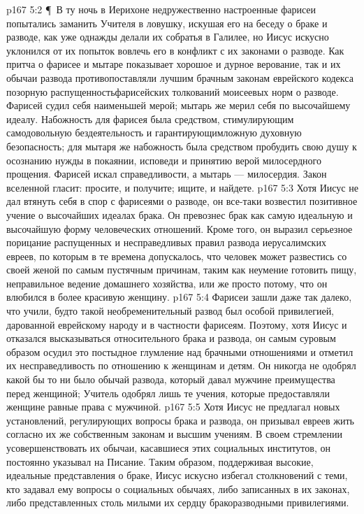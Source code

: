\vs p167 5:2 \P\ В ту ночь в Иерихоне недружественно настроенные фарисеи попытались заманить Учителя в ловушку, искушая его на беседу о браке и разводе, как уже однажды делали их собратья в Галилее, но Иисус искусно уклонился от их попыток вовлечь его в конфликт с их законами о разводе. Как притча о фарисее и мытаре показывает хорошое и дурное верование, так и их обычаи развода противопоставляли лучшим брачным законам еврейского кодекса позорную распущенностьфарисейских толкований моисеевых норм о разводе. Фарисей судил себя наименьшей мерой; мытарь же мерил себя по высочайшему идеалу. Набожность для фарисея была средством, стимулирующим самодовольную бездеятельность и гарантирующимложную духовную безопасность; для мытаря же набожность была средством пробудить свою душу к осознанию нужды в покаянии, исповеди и принятию верой милосердного прощения. Фарисей искал справедливости, а мытарь --- милосердия. Закон вселенной гласит: просите, и получите; ищите, и найдете.
\vs p167 5:3 Хотя Иисус не дал втянуть себя в спор с фарисеями о разводе, он все\hyp{}таки возвестил позитивное учение о высочайших идеалах брака. Он превознес брак как самую идеальную и высочайшую форму человеческих отношений. Кроме того, он выразил серьезное порицание распущенных и несправедливых правил развода иерусалимских евреев, по которым в те времена допускалось, что человек может развестись со своей женой по самым пустячным причинам, таким как неумение готовить пищу, неправильное ведение домашнего хозяйства, или же просто потому, что он влюбился в более красивую женщину.
\vs p167 5:4 Фарисеи зашли даже так далеко, что учили, будто такой необременительный развод был особой привилегией, дарованной еврейскому народу и в частности фарисеям. Поэтому, хотя Иисус и отказался высказываться относительного брака и развода, он самым суровым образом осудил это постыдное глумление над брачными отношениями и отметил их несправедливость по отношению к женщинам и детям. Он никогда не одобрял какой бы то ни было обычай развода, который давал мужчине преимущества перед женщиной; Учитель одобрял лишь те учения, которые предоставляли женщине равные права с мужчиной.
\vs p167 5:5 Хотя Иисус не предлагал новых установлений, регулирующих вопросы брака и развода, он призывал евреев жить согласно их же собственным законам и высшим учениям. В своем стремлении усовершенствовать их обычаи, касавшиеся этих социальных институтов, он постоянно указывал на Писание. Таким образом, поддерживая высокие, идеальные представления о браке, Иисус искусно избегал столкновений с теми, кто задавал ему вопросы о социальных обычаях, либо записанных в их законах, либо представленных столь милыми их сердцу бракоразводными привилегиями.

